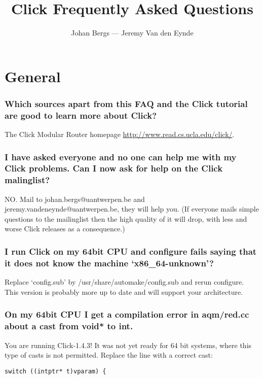 \documentclass[a4paper]{article}
\author{Johan Bergs --- Jeremy Van den Eynde}
\title{Click Frequently Asked Questions}
\date{}
\begin{document}
\maketitle
\tableofcontents

\section{General} %
\label{sec:general}

\subsubsection*{Which sources apart from this FAQ and the Click tutorial are good to learn more about Click?} %
The Click Modular Router homepage \url{http://www.read.cs.ucla.edu/click/}.

\subsubsection*{I have asked everyone and no one can help me with my Click problems. Can
I now ask for help on the Click malinglist?}

NO. Mail to johan.bergs@uantwerpen.be and jeremy.vandeneynde@uantwerpen.be, they will
help you. (If everyone mails simple questions to the mailinglist then
the high quality of it will drop, with less and worse Click releases as
a consequence.)

\subsubsection*{I run Click on my 64bit CPU and configure fails saying that it
does not know the machine `x86\_64-unknown'?}

Replace `config.sub' by /usr/share/automake/config.sub and rerun
configure. This version is probably more up to date and will support
your architecture.

\subsubsection*{On my 64bit CPU I get a compilation error in aqm/red.cc about a cast
from void* to int.}

You are running Click-1.4.3! It was not yet ready for 64 bit systems,
where this type of casts is not permitted. Replace the line with a
correct cast:
\begin{lstlisting}
switch ((intptr* t)vparam) {
\end{lstlisting}
\end{document}
